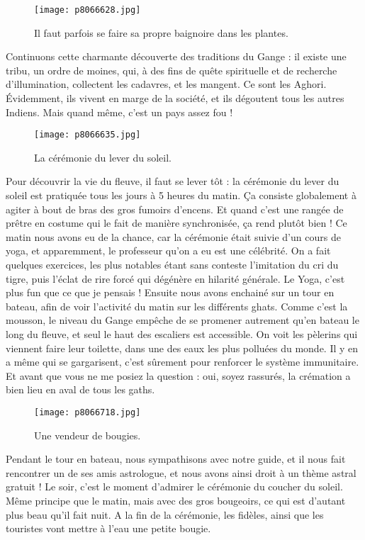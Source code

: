 \documentclass{book}
\begin{document}
\begin{figure}[h]
\centering
\texttt{[image: p8066628.jpg]}
\caption*{Il faut parfois se faire sa propre baignoire dans les plantes.}
\end{figure}

Continuons cette charmante découverte des traditions du Gange : il existe une tribu, un ordre de moines, qui, à des fins de quête spirituelle et de recherche d'illumination, collectent les cadavres, et les mangent. Ce sont les Aghori. Évidemment, ils vivent en marge de la société, et ils dégoutent tous les autres Indiens. Mais quand même, c'est un pays assez fou !


\begin{figure}[h]
\centering
\texttt{[image: p8066635.jpg]}
\caption*{La cérémonie du lever du soleil.}
\end{figure}

Pour découvrir la vie du fleuve, il faut se lever tôt : la cérémonie du lever du soleil est pratiquée tous les jours à 5 heures du matin. Ça consiste globalement à agiter à bout de bras des gros fumoirs d'encens. Et quand c'est une rangée de prêtre en costume qui le fait de manière synchronisée, ça rend plutôt bien ! Ce matin nous avons eu de la chance, car la cérémonie était suivie d'un cours de yoga, et apparemment, le professeur qu'on a eu est une célébrité. On a fait quelques exercices, les plus notables étant sans conteste l'imitation du cri du tigre, puis l'éclat de rire forcé qui dégénère en hilarité générale. Le Yoga, c'est plus fun que ce que je pensais ! Ensuite nous avons enchainé sur un tour en bateau, afin de voir l'activité du matin sur les différents ghats. Comme c'est la mousson, le niveau du Gange empêche de se promener autrement qu'en bateau le long du fleuve, et seul le haut des escaliers est accessible. On voit les pèlerins qui viennent faire leur toilette, dans une des eaux les plus polluées du monde. Il y en a même qui se gargarisent, c'est sûrement pour renforcer le système immunitaire. Et avant que vous ne me posiez la question : oui, soyez rassurés, la crémation a bien lieu en aval de tous les gaths.


\begin{figure}[h]
\centering
\texttt{[image: p8066718.jpg]}
\caption*{Une vendeur de bougies.}
\end{figure}

Pendant le tour en bateau, nous sympathisons avec notre guide, et il nous fait rencontrer un de ses amis astrologue, et nous avons ainsi droit à un thème astral gratuit ! Le soir, c'est le moment d'admirer le cérémonie du coucher du soleil. Même principe que le matin, mais avec des gros bougeoirs, ce qui est d'autant plus beau qu'il fait nuit. A la fin de la cérémonie, les fidèles, ainsi que les touristes vont mettre à l'eau une petite bougie.
\end{document}
